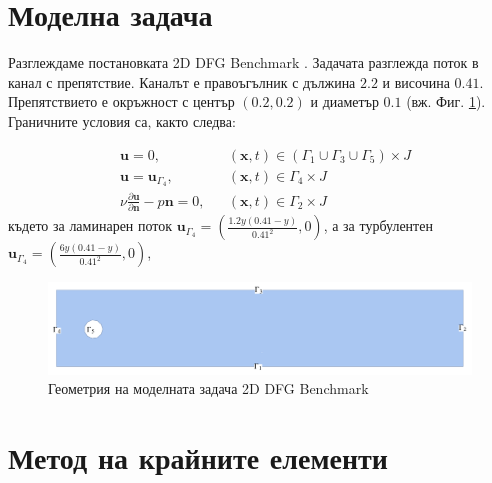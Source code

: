 \documentclass[12pt]{report}
\begin{document}
\section{Моделна задача}
Разглеждаме постановката 2D DFG Benchmark \cite{dfg-problem}. Задачата разглежда поток в канал с препятствие. Каналът е правоъгълник с дължина $2.2$ и височина $0.41$. Препятствието е окръжност с център $(0.2, 0.2)$ и диаметър $0.1$ (вж. Фиг. \ref{fig:2D_DFG_Benchmark}). Граничните условия са, както следва:

\begin{align*}
  &\mathbf{u} = 0, &&\left(\mathbf{x}, t\right) \in \left(\Gamma_1 \cup \Gamma_3 \cup \Gamma_5\right) \times J \\
  &\mathbf{u} = \mathbf{u}_{\Gamma_4}, &&\left(\mathbf{x}, t\right) \in \Gamma_4 \times J \\
  &\nu\frac{\partial\mathbf{u}}{\partial\mathbf{n}} - p\mathbf{n} = 0, &&\left(\mathbf{x}, t\right) \in \Gamma_2 \times J
\end{align*}
където за ламинарен поток $\mathbf{u}_{\Gamma_4}=\left(\frac{1.2y\left(0.41 - y\right)}{0.41^2}, 0\right)$, а за турбулентен $\mathbf{u}_{\Gamma_4}=\left(\frac{6y(0.41-y)}{0.41^2}, 0\right)$,

\begin{figure}[H]
  \centering
  \includegraphics[scale=0.39]{Figures/02_model_problem/2D_DFG_Benchmark.pdf}
  \caption{Геометрия на моделната задача 2D DFG Benchmark}
  \label{fig:2D_DFG_Benchmark}
\end{figure}

\section{Метод на крайните елементи}
\end{document}
